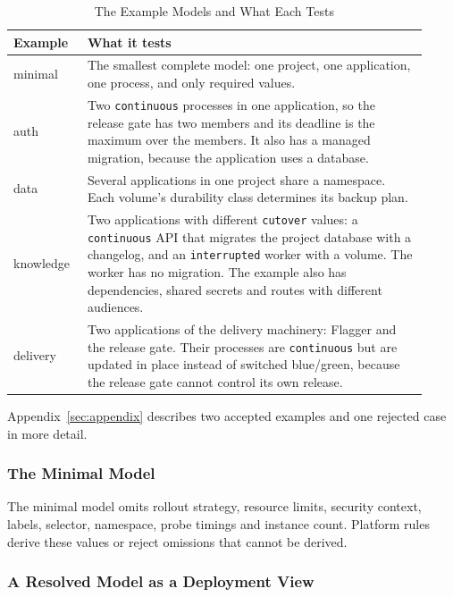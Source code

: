 \begin{table}[!htbp]
\centering
\small
\begin{tabular}{>{\raggedright\arraybackslash}p{0.16\linewidth}>{\raggedright\arraybackslash}p{0.76\linewidth}}
\hline
\textbf{Example} & \textbf{What it tests} \\
\hline
minimal & The smallest complete model: one project, one application, one
  process, and only required values. \\
auth & Two \texttt{continuous} processes in one application, so the release gate has two
  members and its deadline is the maximum over the members. It also has a
  managed migration, because the application uses a database. \\
data & Several applications in one project share a namespace. Each volume's
  durability class determines its backup plan. \\
knowledge & Two applications with different \texttt{cutover} values: a
  \texttt{continuous} API that migrates the project database with a changelog,
  and an \texttt{interrupted} worker
  with a volume. The worker has no migration. The example also has dependencies,
  shared secrets and routes with different audiences. \\
delivery & Two applications of the delivery machinery: Flagger and the release gate.
  Their processes are \texttt{continuous} but are updated in place instead of
  switched blue/green, because the release gate cannot control its own
  release. \\
\hline
\end{tabular}
\caption{The Example Models and What Each Tests}
\label{tab:examples}
\end{table}

Appendix~\ref{sec:appendix} describes two accepted examples and one rejected
case in more detail.

\subsubsection{The Minimal Model}

The minimal model omits rollout strategy, resource limits, security context,
labels, selector, namespace, probe timings and instance count. Platform rules
derive these values or reject omissions that cannot be derived.

\subsubsection{A Resolved Model as a Deployment View}

